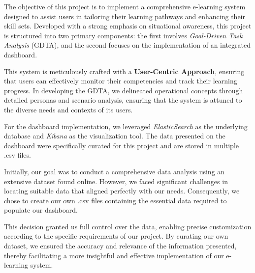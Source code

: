 The objective of this project is to implement a comprehensive e-learning system designed to assist users in tailoring their learning pathways and enhancing their skill sets. Developed with a strong emphasis on situational awareness, this project is structured into two primary components: the first involves \textit{Goal-Driven Task Analysis} (GDTA), and the second focuses on the implementation of an integrated dashboard.

This system is meticulously crafted with a \textbf{User-Centric Approach}, ensuring that users can effectively monitor their competencies and track their learning progress. In developing the GDTA, we delineated operational concepts through detailed personas and scenario analysis, ensuring that the system is attuned to the diverse needs and contexts of its users.

For the dashboard implementation, we leveraged \textit{ElasticSearch} as the underlying database and \textit{Kibana} as the visualization tool. The data presented on the dashboard were specifically curated for this project and are stored in multiple .csv files. 

Initially, our goal was to conduct a comprehensive data analysis using an extensive dataset found online. However, we faced significant challenges in locating suitable data that aligned perfectly with our needs. Consequently, we chose to create our own .csv files containing the essential data required to populate our dashboard. 

This decision granted us full control over the data, enabling precise customization according to the specific requirements of our project. By curating our own dataset, we ensured the accuracy and relevance of the information presented, thereby facilitating a more insightful and effective implementation of our e-learning system.


